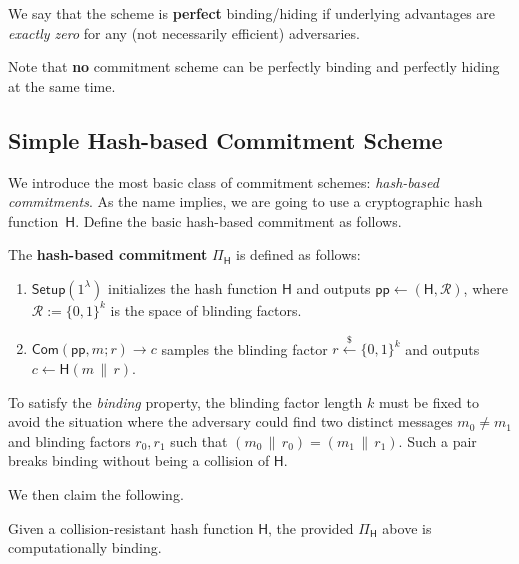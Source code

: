 \documentclass[../../book]{subfiles}
\begin{document}
\begin{remark}
    We say that the scheme is \textbf{perfect} binding/hiding if underlying advantages are \emph{exactly zero} for any (not necessarily efficient) adversaries.
\end{remark}

\begin{remark}
     Note that \textbf{no} commitment scheme can be perfectly binding and perfectly hiding at the same time. 
\end{remark}

\subsection{Simple Hash-based Commitment Scheme}

We introduce the most basic class of commitment schemes: \emph{hash-based commitments}.
As the name implies, we are going to use a cryptographic hash function~\(\mathsf{H}\).
Define the basic hash-based commitment as follows.

\begin{definition}\label{def:hash-based-commitment}
    The \textbf{hash-based commitment} $\Pi_{\mathsf{H}}$ is defined as follows:
    \begin{enumerate}
        \item $\mathsf{Setup}(1^{\lambda})$ initializes the hash function $\mathsf{H}$ and outputs $\mathsf{pp} \gets (\mathsf{H}, \mathcal{R})$, where $\mathcal{R} := \{0,1\}^{k}$ is the space of blinding factors.
        \item $\mathsf{Com}(\mathsf{pp}, m; r) \to c$ samples the blinding factor $r\xleftarrow{\$}\{0,1\}^k$ and outputs $c \gets \mathsf{H}(m \,\|\, r)$.
    \end{enumerate}
\end{definition}

\begin{remark}
     To satisfy the \emph{binding} property, the blinding factor length $k$ must be fixed to avoid the situation where the adversary could find two distinct messages $m_0 \neq m_1$ and blinding factors $r_0, r_1$ such that $(m_0 \,\|\, r_0) = (m_1 \,\|\, r_1)$. Such a pair breaks binding without being a collision of $\mathsf{H}$.
\end{remark}

We then claim the following.

\begin{lemma}
    Given a collision-resistant hash function $\mathsf{H}$, the provided $\Pi_{\mathsf{H}}$ above is computationally binding.
\end{lemma}
\end{document}
